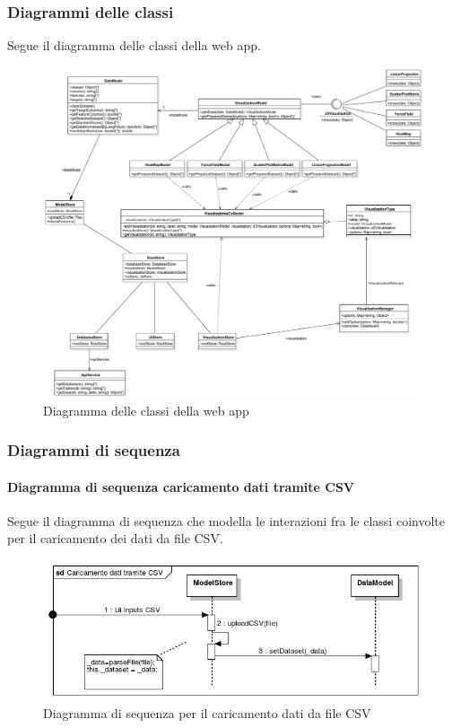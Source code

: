     \pagebreak
    
    \subsubsection{Diagrammi delle classi}
    Segue il diagramma delle classi della web app.
    \begin{figure}[H]
        \centering\includegraphics[width=1\textwidth]{source/img/classi.pdf}
        \caption{Diagramma delle classi della web app}
    \end{figure}
    
    \pagebreak
    
    \subsubsection{Diagrammi di sequenza}
        \paragraph{Diagramma di sequenza caricamento dati tramite CSV}
        Segue il diagramma di sequenza che modella le interazioni fra le classi coinvolte per il caricamento dei dati da file CSV.
            \begin{figure}[H]
                \centering\includegraphics[width=1\textwidth]{source/img/sequenza1.jpeg}
                \caption{Diagramma di sequenza per il caricamento dati da file CSV}
            \end{figure}
            
